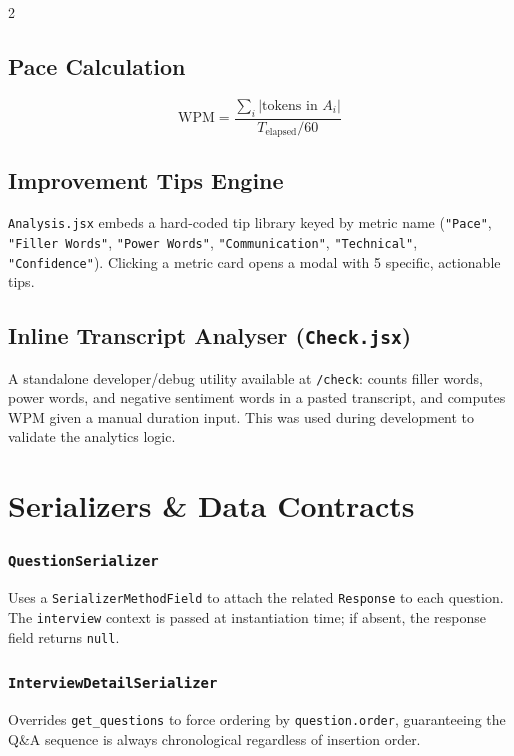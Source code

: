\documentclass[10pt, a4paper]{article}
\begin{document}
\begin{multicols}{2}
\subsection{Pace Calculation}
\begin{equation}
\text{WPM} = \frac{\sum_i \left|\text{tokens in } A_i\right|}{T_{\text{elapsed}} / 60}
\end{equation}

\subsection{Improvement Tips Engine}
\texttt{Analysis.jsx} embeds a hard-coded tip library keyed by metric name
(\texttt{"Pace"}, \texttt{"Filler Words"}, \texttt{"Power Words"},
\texttt{"Communication"}, \texttt{"Technical"}, \texttt{"Confidence"}).
Clicking a metric card opens a modal with 5 specific, actionable tips.

\subsection{Inline Transcript Analyser (\texttt{Check.jsx})}
A standalone developer/debug utility available at \texttt{/check}:
counts filler words, power words, and negative sentiment words in a pasted
transcript, and computes WPM given a manual duration input. This was
used during development to validate the analytics logic.

\section{Serializers \& Data Contracts}

\subsubsection{\texttt{QuestionSerializer}}
Uses a \texttt{SerializerMethodField} to attach the related
\texttt{Response} to each question. The \texttt{interview} context
is passed at instantiation time; if absent, the response field returns
\texttt{null}.

\subsubsection{\texttt{InterviewDetailSerializer}}
Overrides \texttt{get\_questions} to force ordering by
\texttt{question.order}, guaranteeing the Q\&A sequence is always
chronological regardless of insertion order.


\end{multicols}
\end{document}
